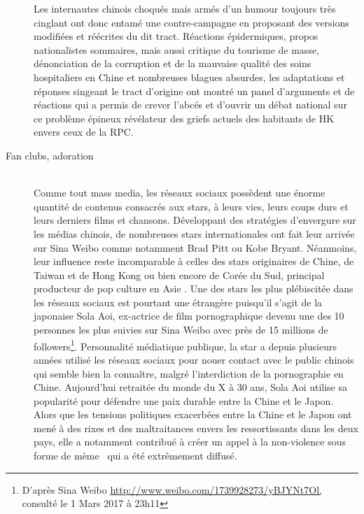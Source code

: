 \begin{description}
Les internautes chinois choqu\'es mais arm\'es d{\textquoteright}un humour toujours tr\`es cinglant ont donc entam\'e une contre-campagne en proposant des versions modifi\'ees et r\'e\'ecrites du dit tract. R\'eactions \'epidermiques, propos nationalistes sommaires, mais aussi critique du tourisme de masse, d\'enonciation de la corruption et de la mauvaise qualit\'e des soins hospitaliers en Chine et nombreuses blagues absurdes, les adaptations et r\'eponses singeant le tract d{\textquoteright}origine ont montr\'e un panel d{\textquoteright}arguments et de r\'eactions qui a permis de crever l{\textquoteright}abc\'es et d{\textquoteright}ouvrir un d\'ebat national sur ce probl\`eme \'epineux r\'ev\'elateur des griefs actuels des habitants de HK envers ceux de la RPC.  


\item[Fan clubs, adoration]
\hfill \\
Comme tout mass media, les r\'eseaux sociaux poss\`edent une \'enorme quantit\'e de contenus consacr\'es aux stars, \`a leurs vies, leurs coups durs et leurs derniers films et chansons. D\'eveloppant des strat\'egies d{\textquoteright}envergure sur les m\'edias chinois, de nombreuses stars internationales ont fait leur arriv\'ee sur Sina Weibo comme notamment Brad Pitt ou Kobe Bryant. N\'eanmoins, leur influence reste incomparable \`a celles des stars originaires de Chine, de Taiwan et de Hong Kong ou bien encore de Cor\'ee du Sud, principal producteur de pop culture en Asie \cite{Martel2010}. Une des stars les plus pl\'ebiscit\'ee dans les r\'eseaux sociaux est pourtant une \'etrang\`ere puisqu{\textquoteright}il s{\textquoteright}agit de la japonaise Sola Aoi, ex-actrice de film pornographique devenu une des 10 personnes les plus suivies sur Sina Weibo avec pr\`es de 15 millions de followers\footnote{ D{\textquoteright}apr\`es Sina Weibo \url{http://www.weibo.com/1739928273/yBJYNt7Ol,} consult\'e le 1 Mars 2017 \`a 23h11}. Personnalit\'e m\'ediatique publique, la star a depuis plusieurs ann\'ees utilis\'e les r\'eseaux sociaux pour nouer contact avec le public chinois qui semble bien la conna\^itre, malgr\'e l{\textquoteright}interdiction de la pornographie en Chine. Aujourd{\textquoteright}hui retrait\'ee du monde du X \`a 30 ans, Sola Aoi utilise sa popularit\'e pour d\'efendre une paix durable entre la Chine et le Japon. Alors que les tensions politiques exacerb\'ees entre la Chine et le Japon ont men\'e \`a des rixes et des maltraitances envers les ressortissants dans les deux pays, elle a notamment contribu\'e \`a cr\'eer un appel \`a la non-violence sous forme de m\`eme \ qui a \'et\'e extr\^emement diffus\'e.  


\end{description}
